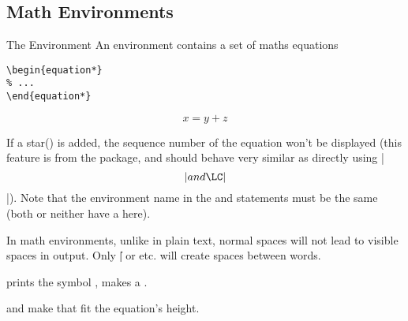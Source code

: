 \subsection{Math Environments}


\begin{frame}[fragile]{The  Environment}
	An  environment contains a set of maths equations
	\begin{command}
		\begin{verbatim}
\begin{equation*}
% ...
\end{equation*}
		\end{verbatim}
	\end{command}
	\begin{example}
		\begin{equation*}
      x = y + z
    \end{equation*}
	\end{example}
  \pause
	If a star(\structure{*}) is added, the sequence number of the equation won't be displayed (this feature is from the  package, and should behave very similar as directly using \LC|\[| and \LC|\]|). Note that the environment name in the \LC{\begin} and \LC{\end} statements must be the same (both or neither have a \structure{*} here).
\end{frame}

\begin{frame}[fragile]
	
	In math environments, unlike in plain text, normal spaces will not lead to visible spaces in output. Only  \LC|\|\packagename{\textvisiblespace} or \LC{\quad,\qquad} etc. will create spaces between words. \medskip
	
	\LC{\partial} prints the symbol \structure{$\partial$},  makes a . \medskip
	
	\LC{\left(} and \LC{\right(} make  that fit the equation's height.	
\end{frame}

